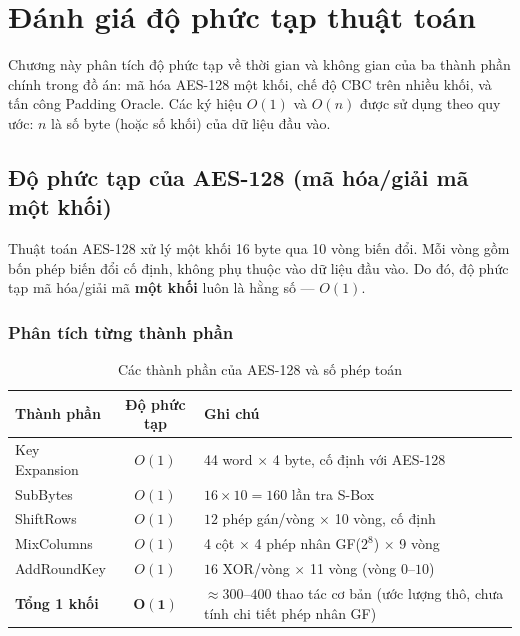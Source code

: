 \chapter{Đánh giá độ phức tạp thuật toán}
\label{chap:complexity}

Chương này phân tích độ phức tạp về thời gian và không gian của ba thành phần chính trong đồ án: mã hóa AES-128 một khối, chế độ CBC trên nhiều khối, và tấn công Padding Oracle. Các ký hiệu $O(1)$ và $O(n)$ được sử dụng theo quy ước: $n$ là số byte (hoặc số khối) của dữ liệu đầu vào.

\section{Độ phức tạp của AES-128 (mã hóa/giải mã một khối)}
\label{sec:cplx-aes128}

Thuật toán AES-128 xử lý một khối 16 byte qua 10 vòng biến đổi. Mỗi vòng gồm bốn phép biến đổi cố định, không phụ thuộc vào dữ liệu đầu vào. Do đó, độ phức tạp mã hóa/giải mã \textbf{một khối} luôn là hằng số --- $O(1)$.

\subsection{Phân tích từng thành phần}

\begin{table}[htbp]
\centering
\caption{Các thành phần của AES-128 và số phép toán}
\label{tab:aes128-ops}
\begin{tabular}{@{}p{3.5cm}cp{5.5cm}@{}}
\toprule
\textbf{Thành phần} & \textbf{Độ phức tạp} & \textbf{Ghi chú} \\
\midrule
Key Expansion        & $O(1)$ & 44 word $\times$ 4 byte, cố định với AES-128 \\
SubBytes             & $O(1)$ & $16 \times 10 = 160$ lần tra S-Box \\
ShiftRows            & $O(1)$ & $12$ phép gán/vòng $\times$ 10 vòng, cố định \\
MixColumns           & $O(1)$ & 4 cột $\times$ 4 phép nhân GF($2^8$) $\times$ 9 vòng \\
AddRoundKey          & $O(1)$ & $16$ XOR/vòng $\times$ 11 vòng (vòng $0$--$10$) \\
\midrule
\textbf{Tổng 1 khối} & $\mathbf{O(1)}$ & $\approx 300$--$400$ thao tác cơ bản (ước lượng thô, chưa tính chi tiết phép nhân GF) \\
\bottomrule
\end{tabular}
\end{table}

